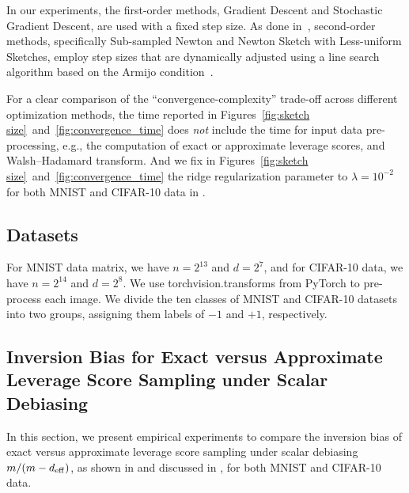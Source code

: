 \documentclass[11pt,a4paper]{article}
\begin{document}
In our experiments, the first-order methods, Gradient Descent and Stochastic Gradient Descent, are used with a fixed step size. 
As done in~\citet{derezinski2021newtonless}, second-order methods, specifically Sub-sampled Newton and Newton Sketch with Less-uniform Sketches, employ step sizes that are dynamically adjusted using a line search algorithm based on the Armijo condition~\citep[Chapter~3]{bonnans2006numerical}.

For a clear comparison of the ``convergence-complexity'' trade-off across different optimization methods, the time reported in Figures~\ref{fig:sketch size}~and~\ref{fig:convergence_time} does \emph{not} include the time for input data pre-processing, e.g.,  the computation of exact or approximate leverage scores, and Walsh–Hadamard transform.
And we fix in Figures~\ref{fig:sketch size}~and~\ref{fig:convergence_time} the ridge regularization parameter to $\lambda=10^{-2}$ for both MNIST and CIFAR-10 data in .


\subsection{Datasets}\label{sec:Datasets}

For MNIST data matrix, we have $n = 2^{13}$ and $d =2^7$, and for CIFAR-10 data, we have $n =2^{14}$ and $d =2^8$.  
We use \textsf{torchvision.transforms} from PyTorch to pre-process each image. 
We divide the ten classes of MNIST and CIFAR-10 datasets into two groups, assigning them labels of $-1$ and $+1$, respectively.


\subsection{Inversion Bias for Exact versus Approximate Leverage Score Sampling under Scalar Debiasing}
\label{subsec:numerical inversion bias}


In this section, we present empirical experiments to compare the inversion bias of exact versus approximate leverage score sampling under scalar debiasing $m/(m-d_{\mathrm{eff}})$, as shown in  and discussed in , for both MNIST and CIFAR-10 data.
\end{document}
